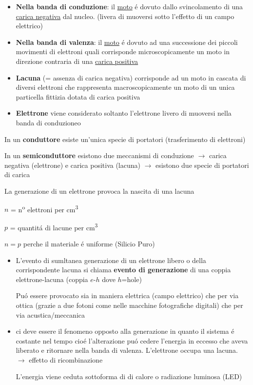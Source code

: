 \begin{itemize}
    \item \textbf{Nella banda di conduzione}: il \underline{moto} \'e dovuto dallo svincolamento di una \underline{carica negativa} dal nucleo. (livera di muoversi sotto l'effetto di un campo elettrico)

    \item \textbf{Nella banda di valenza}: il \underline{moto} \'e dovuto ad una successione dei piccoli movimenti di elettroni quali corrisponde microscopicamente un moto in direzione contraria di una \underline{carica positiva}


    \item \textbf{Lacuna} (= assenza di carica negativa) corrisponde ad un moto in cascata di diversi elettroni che rappresenta macroscopicamente un moto di un unica particella fittizia dotata di carica positiva

    \item \textbf{Elettrone} viene considerato soltanto l'elettrone livero di muoversi nella banda di conduzioneo
\end{itemize}

In un \textbf{conduttore} esiste un'unica specie di portatori (trasferimento di elettroni)

In un \textbf{semiconduttore} esistono due meccanismi di conduzione $\rightarrow$ carica negativa (elettrone) e carica positiva (lacuna) $\rightarrow$ esistono due specie di portatori di carica

La generazione di un elettrone provoca la nascita di una lacuna

$n$ = n\textsuperscript{o} elettroni per cm\textsuperscript{3}

$p$ = quantit\'a di lacune per cm\textsuperscript{3}

$n=p$ perche il materiale \'e uniforme (Silicio Puro)

\begin{itemize}
    \item L'evento di sumltanea generazione di un elettrone libero o della corrispondente lacuna si chiama \textbf{evento di generazione} di una coppia elettrone-lacuna (coppia $e$-$h$ dove $h$=hole)

        Pu\'o essere provocato sia in maniera elettrica (campo elettrico) che per via ottica (grazie a due fotoni come nelle macchine fotografiche digitali) che per via acustica/meccanica
    \item ci deve essere il fenomeno opposto alla generazione in quanto il sistema \'e costante nel tempo cio\'e l'alterazione pu\'o cedere l'energia in eccesso che aveva liberato e ritornare nella banda di valenza. L'elettrone occupa una lacuna. $\rightarrow$ effetto di ricombinazione

        L'energia viene ceduta sottoforma di di calore o radiazione luminosa (LED)
\end{itemize}

